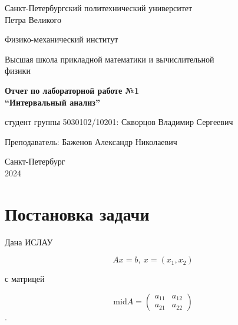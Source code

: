 \documentclass{article}
\begin{document}
  \begin{titlepage}
    \begin{center}
      Санкт-Петербургский политехнический университет \\Петра Великого
    \end{center}

    \begin{center}
      Физико-механический институт
    \end{center}

    \begin{center}
      Высшая школа прикладной математики и вычислительной\\ физики
    \end{center}

    \vspace{8em}

    \begin{center}
      \textbf{Отчет по лабораторной работе №1}\\
      \textbf{“Интервальный анализ”}
    \end{center}

    \vspace{\fill}

    \begin{flushright}
       студент группы 5030102/10201:
      \hfill
      Скворцов Владимир Сергеевич \\
    \end{flushright}
    Преподаватель: \hfill Баженов Александр Николаевич

    \vspace{12em}

    \begin{center}
      Санкт-Петербург\\
      2024
    \end{center}
  \end{titlepage}

  \tableofcontents

  \newpage

  \section{Постановка задачи}

  Дана ИСЛАУ

  \[
    Ax = b, \ x = (x_1, x_2)
  \]

  с матрицей

  \[
    \text{mid} A = \begin{pmatrix}
      a_{11} & a_{12} \\
      a_{21} & a_{22}
    \end{pmatrix}
  \].
\end{document}
